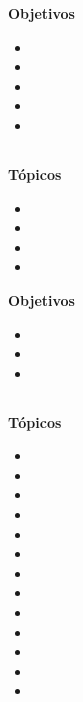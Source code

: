 \textbf{Objetivos}
\begin{itemize}
	\item \ALCINCOObjUNO
	\item \ALCINCOObjDOS
	\item \ALCINCOObjTRES
	\item \ALCINCOObjCUATRO
	\item \ALCINCOObjCINCO
\end{itemize}

\subsection{\ALSEISDef }\label{sec:BOK-AL6}

\textbf{Tópicos}
\begin{itemize}
	\item \ALSEISTopicDefinicion
	\item \ALSEISTopicNP
	\item \ALSEISTopicProblemas
	\item \ALSEISTopicTecnicas
\end{itemize}

\textbf{Objetivos}
\begin{itemize}
	\item \ALSEISObjUNO
	\item \ALSEISObjDOS
	\item \ALSEISObjTRES
\end{itemize}

\subsection{\ALSIETEDef }\label{sec:BOK-AL7}

\textbf{Tópicos}
\begin{itemize}
	\item \ALSIETETopicAutomatas
	\item \ALSIETETopicAutomatasfinitos
	\item \ALSIETETopicEquivalencias
	\item \ALSIETETopicExpresiones
	\item \ALSIETETopicEl
	\item \ALSIETETopicAutomatasde
	\item \ALSIETETopicRelacion
	\item \ALSIETETopicPropiedades
	\item \ALSIETETopicMaquinas
	\item \ALSIETETopicMaquinasde
	\item \ALSIETETopicConjuntos
	\item \ALSIETETopicLa
	\item \ALSIETETopicLatesis
\end{itemize}

